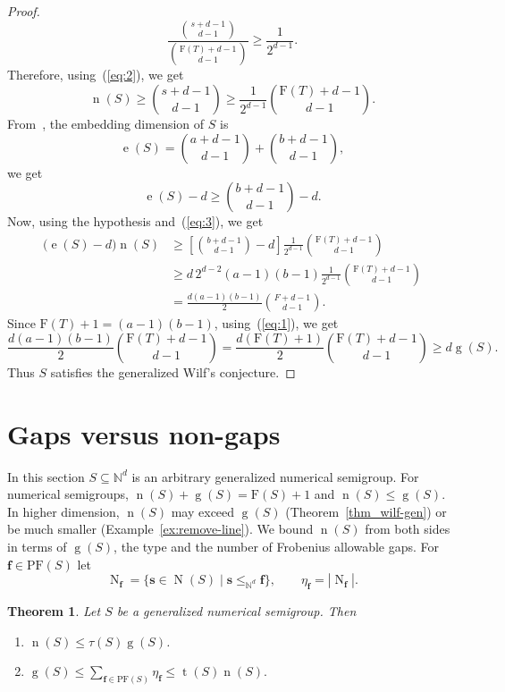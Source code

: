 \documentclass[12pt]{amsart}
\newcommand{\numberset}{\mathbb}
\newcommand{\N}{\numberset{N}}
\theoremstyle{plain}
\theoremstyle{theorem}
\newtheorem{theorem}[definition]{Theorem}
\theoremstyle{remark}
\begin{document}
\begin{proof}
	\[ \frac{\binom{s+d-1}{d-1}}{\binom{\mathrm{F}(T)+d-1}{d-1}} \geq
	\frac{1}{2^{d-1}}. \]
	Therefore, using~(\ref{eq:2}), we get
	\begin{equation}\label{eq:3}
	\operatorname{n}(S) \geq \binom{s+d-1}{d-1} \geq
		\frac{1}{2^{d-1}}
		\binom{\mathrm{F}(T)+d-1}{d-1}.
		\tag{3}
	\end{equation}
	From~\cite[Corollary~4.7]{Cisto-Navarra}, the embedding dimension of $S$ is
	\[ \operatorname{e}(S) =	\binom{a+d-1}{d-1}	+	\binom{b+d-1}{d-1},\]
	we get
	\[\operatorname{e}(S)-d \geq \binom{b+d-1}{d-1}-d.\]
	Now, using the hypothesis and~(\ref{eq:3}), we get
	\begin{align*}
		\bigl(\operatorname{e}(S)-d\bigr)\operatorname{n}(S) &\geq \left[ \binom{b+d-1}{d-1}-d \right] \frac{1}{2^{d-1}}
		\binom{\mathrm{F}(T)+d-1}{d-1}\\
		&\geq
		d\,2^{d-2}(a-1)(b-1)
		\frac{1}{2^{d-1}}
		\binom{\mathrm{F}(T)+d-1}{d-1}\\
		&=
		\frac{d(a-1)(b-1)}{2}
		\binom{F+d-1}{d-1}.
	\end{align*}
	Since $\mathrm{F}(T)+1=(a-1)(b-1)$, using~(\ref{eq:1}), we get
	\[ \frac{d(a-1)(b-1)}{2} \binom{\mathrm{F}(T)+d-1}{d-1}
	= \frac{d(\mathrm{F}(T)+1)}{2} \binom{\mathrm{F}(T)+d-1}{d-1} \geq d\operatorname{g}(S).\]
	Thus $S$ satisfies the generalized Wilf's conjecture.
\end{proof}



\section{Gaps versus non-gaps}\label{sec:gaps-nongaps}


In this section $S\subseteq\N^d$ is an arbitrary generalized numerical semigroup. For numerical semigroups, $\operatorname{n}(S)+\operatorname{g}(S)=\mathrm{F}(S)+1$ and $\operatorname{n}(S)\leq \operatorname{g}(S)$. In higher dimension, $\operatorname{n}(S)$ may exceed $\operatorname{g}(S)$ (Theorem~\ref{thm_wilf-gen}) or be much smaller (Example~\ref{ex:remove-line}). We bound $\operatorname{n}(S)$ from both sides in terms of $\operatorname{g}(S)$, the type and the number of Frobenius allowable gaps. For $\mathbf{f}\in\mathrm{PF}(S)$ let
\[
\operatorname{N}_{\mathbf{f}}=\{\mathbf{s}\in \operatorname{N}(S)\mid \mathbf{s}\leq_{\mathbb{N}^d}\mathbf{f}\},\qquad\eta_{\mathbf{f}}=|\operatorname{N}_{\mathbf{f}}|.
\]

\begin{theorem}\label{thm:g-n-upper-lower}
Let $S$ be a generalized numerical semigroup. Then
\begin{enumerate}
    \item $\operatorname{n}(S)\leq \tau(S)\operatorname{g}(S)$.
    \item $\operatorname{g}(S)\leq \sum_{\mathbf{f}\in\mathrm{PF}(S)}\eta_{\mathbf{f}} \leq \operatorname{t}(S)\operatorname{n}(S).$
\end{enumerate}

\end{theorem}
\end{document}
